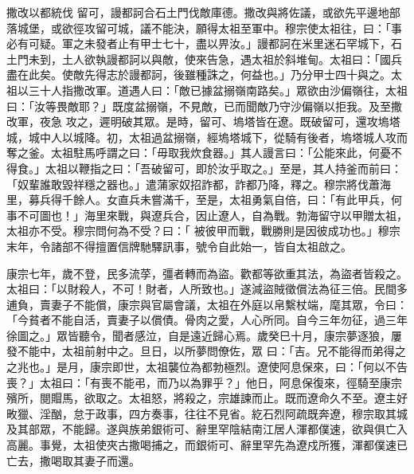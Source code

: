 \begin{pinyinscope}
 撒改以都統伐
 留可，謾都訶合石土門伐敵庫德。撒改與將佐議，或欲先平邊地部落城堡，或欲徑攻留可城，議不能決，願得太祖至軍中。穆宗使太祖往，曰：「事必有可疑。軍之未發者止有甲士七十，盡以畀汝。」謾都訶在米里迷石罕城下，石土門未到，土人欲執謾都訶以與敵，使來告急，遇太祖於斜堆甸。太祖曰：「國兵盡在此矣。使敵先得志於謾都訶，後雖種誅之，何益也。」乃分甲士四十與之。太祖以三十人指撒改軍。道遇人曰：「敵已據盆搦嶺南路矣。」眾欲由沙偏嶺往，太祖曰：「汝等畏敵耶？」既度盆搦嶺，不見敵，已而聞敵乃守沙偏嶺以拒我。及至撒改軍，夜急
 攻之，遲明破其眾。是時，留可、塢塔皆在遼。既破留可，還攻塢塔城，城中人以城降。初，太祖過盆搦嶺，經塢塔城下，從騎有後者，塢塔城人攻而奪之釜。太祖駐馬呼謂之曰：「毋取我炊食器。」其人謾言曰：「公能來此，何憂不得食。」太祖以鞭指之曰：「吾破留可，即於汝乎取之。」至是，其人持釜而前曰：「奴輩誰敢毀祥穩之器也。」遣蒲家奴招詐都，詐都乃降，釋之。穆宗將伐蕭海里，募兵得千餘人。女直兵未嘗滿千，至是，太祖勇氣自倍，曰：「有此甲兵，何事不可圖也！」海里來戰，與遼兵合，因止遼人，自為戰。勃海留守以甲贈太祖，太祖亦不受。穆宗問何為不受？曰：「
 被彼甲而戰，戰勝則是因彼成功也。」穆宗末年，令諸部不得擅置信牌馳驛訊事，號令自此始一，皆自太祖啟之。



 康宗七年，歲不登，民多流莩，彊者轉而為盜。歡都等欲重其法，為盜者皆殺之。太祖曰：「以財殺人，不可！財者，人所致也。」遂減盜賊徵償法為征三倍。民間多逋負，賣妻子不能償，康宗與官屬會議，太祖在外庭以帛繫杖端，麾其眾，令曰：「今貧者不能自活，賣妻子以償債。骨肉之愛，人心所同。自今三年勿征，過三年徐圖之。」眾皆聽令，聞者感泣，自是遠近歸心焉。歲癸巳十月，康宗夢逐狼，屢發不能中，太祖前射中之。旦日，以所夢問僚佐，眾
 曰：「吉。兄不能得而弟得之之兆也。」是月，康宗即世，太祖襲位為都勃極烈。遼使阿息保來，曰：「何以不告喪？」太祖曰：「有喪不能弔，而乃以為罪乎？」他日，阿息保復來，徑騎至康宗殯所，閱賵馬，欲取之。太祖怒，將殺之，宗雄諫而止。既而遼命久不至。遼主好畋獵、淫酗，怠于政事，四方奏事，往往不見省。紇石烈阿疏既奔遼，穆宗取其城及其部眾，不能歸。遂與族弟銀術可、辭里罕陰結南江居人渾都僕速，欲與俱亡入高麗。事覺，太祖使夾古撒喝捕之，而銀術可、辭里罕先為遼戍所獲，渾都僕速已亡去，撒喝取其妻子而還。




\end{pinyinscope}
